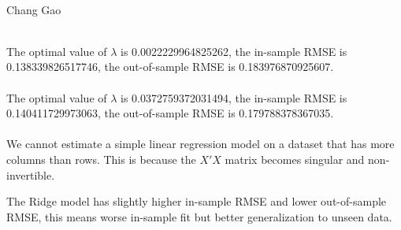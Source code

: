 \documentclass[12pt,letterpaper]{article}
\begin{document}
	\begin{center}
		\smallskip\\
		Chang Gao\smallskip\\
	\end{center}
	\medskip\\
	The optimal value of $\lambda$ is 0.0022229964825262, the in-sample RMSE is 0.138339826517746, the out-of-sample RMSE is 0.183976870925607.\medskip\\
	\medskip\\
	The optimal value of $\lambda$ is 0.0372759372031494, the in-sample RMSE is 0.140411729973063, the out-of-sample RMSE is 0.179788378367035.\medskip\\
	\medskip\\
	We cannot estimate a simple linear regression model on a dataset that has more columns than rows. This is because the $X'X$ matrix becomes singular and non-invertible.
	
	The Ridge model has slightly higher in-sample RMSE and lower out-of-sample RMSE, this means worse in-sample fit but better generalization to unseen data.
	
		

	
	
	
	
	
	
\end{document}
